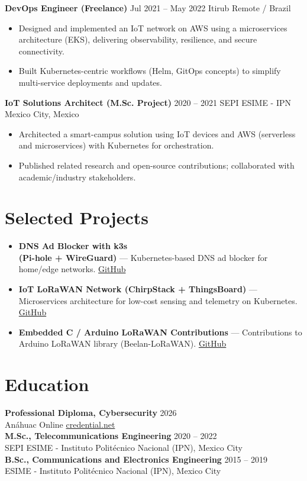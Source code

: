 \documentclass[11pt,a4paper]{article}
\newcommand{\role}[2]{\textbf{#1} \hfill {\small #2}}%
\newcommand{\org}[2]{{#1} \hfill {\small #2}}%
\begin{document}
\role{DevOps Engineer (Freelance)}{Jul 2021 -- May 2022}
\org{Itirub}{Remote / Brazil}
\begin{itemize}
  \item Designed and implemented an IoT network on AWS using a microservices architecture (EKS), delivering observability, resilience, and secure connectivity.
  \item Built Kubernetes-centric workflows (Helm, GitOps concepts) to simplify multi-service deployments and updates.
\end{itemize}

\role{IoT Solutions Architect (M.Sc. Project)}{2020 -- 2021}
\org{SEPI ESIME - IPN}{Mexico City, Mexico}
\begin{itemize}
  \item Architected a smart-campus solution using IoT devices and AWS (serverless and microservices) with Kubernetes for orchestration.
  \item Published related research and open-source contributions; collaborated with academic/industry stakeholders.
\end{itemize}

\section*{Selected Projects}
\begin{itemize}
  \item \textbf{DNS Ad Blocker with k3s \\ (Pi-hole + WireGuard)} — Kubernetes-based DNS ad blocker for home/edge networks. \href{https://github.com/ivanmorenoj/k3s-pihole-wireguard}{GitHub}
  \item \textbf{IoT LoRaWAN Network (ChirpStack + ThingsBoard)} — Microservices architecture for low-cost sensing and telemetry on Kubernetes. \href{https://github.com/ivanmorenoj/chirpstack-thingsboard}{GitHub}
  \item \textbf{Embedded C / Arduino LoRaWAN Contributions} — Contributions to Arduino LoRaWAN library (Beelan-LoRaWAN). \href{https://github.com/BeelanMX/Beelan-LoRaWAN}{GitHub}
\end{itemize}

\section*{Education}
\textbf{Professional Diploma, Cybersecurity} \hfill 2026\\
Anáhuac Online \hfill \href{https://www.credential.net/021951bd-98a4-458e-8aca-1b071171eff3}{credential.net}\\[4pt]
\textbf{M.Sc., Telecommunications Engineering} \hfill 2020 -- 2022\\
SEPI ESIME - Instituto Politécnico Nacional (IPN), Mexico City\\[4pt]
\textbf{B.Sc., Communications and Electronics Engineering} \hfill 2015 -- 2019\\
ESIME - Instituto Politécnico Nacional (IPN), Mexico City
\end{document}
